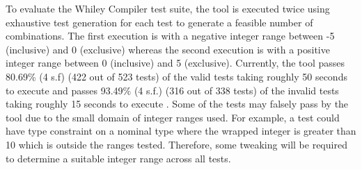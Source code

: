 To evaluate the Whiley Compiler test suite, the tool is executed twice using exhaustive test generation for each test to generate a feasible number of combinations. 
The first execution is with a negative integer range between -5 (inclusive) and 0 (exclusive) whereas the second execution is with a positive integer range between 0 (inclusive) and 5 (exclusive).
Currently, the tool passes 80.69\% (4 s.f) (422 out of 523 tests) of the valid tests taking roughly 50 seconds to execute and passes 93.49\% (4 s.f.) (316 out of 338 tests) of the invalid tests taking roughly 15 seconds to execute \cite{qcWhileyStatistics}. 
Some of the tests may falsely pass by the tool due to the small domain of integer ranges used. 
For example, a test could have type constraint on a nominal type where the wrapped integer is greater than 10 which is outside the ranges tested. 
Therefore, some tweaking will be required to determine a suitable integer range across all tests.

